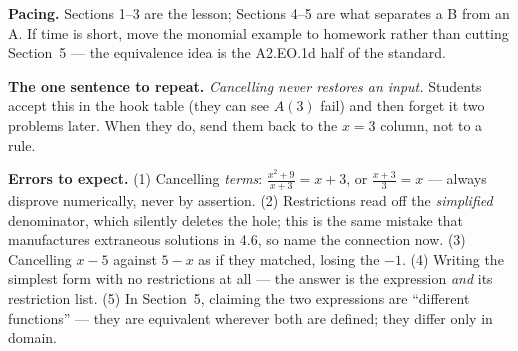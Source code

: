 \documentclass[10pt]{article}
\begin{document}
\begin{teachernote}
\textbf{Pacing.} Sections 1--3 are the lesson; Sections 4--5 are what separates a B from an A. If time
is short, move the monomial example to homework rather than cutting Section~5 --- the equivalence idea
is the A2.EO.1d half of the standard.

\vspace{3pt}
\textbf{The one sentence to repeat.} \emph{Cancelling never restores an input.} Students accept this in
the hook table (they can see $A(3)$ fail) and then forget it two problems later. When they do, send
them back to the $x=3$ column, not to a rule.

\vspace{3pt}
\textbf{Errors to expect.} (1) Cancelling \emph{terms}: $\frac{x^2+9}{x+3}=x+3$, or $\frac{x+3}{3}=x$
--- always disprove numerically, never by assertion. (2) Restrictions read off the \emph{simplified}
denominator, which silently deletes the hole; this is the same mistake that manufactures extraneous
solutions in 4.6, so name the connection now. (3) Cancelling $x-5$ against $5-x$ as if they matched,
losing the $-1$. (4) Writing the simplest form with no restrictions at all --- the answer is the
expression \emph{and} its restriction list. (5) In Section~5, claiming the two expressions are
``different functions'' --- they are equivalent wherever both are defined; they differ only in domain.
\end{teachernote}
\end{document}
